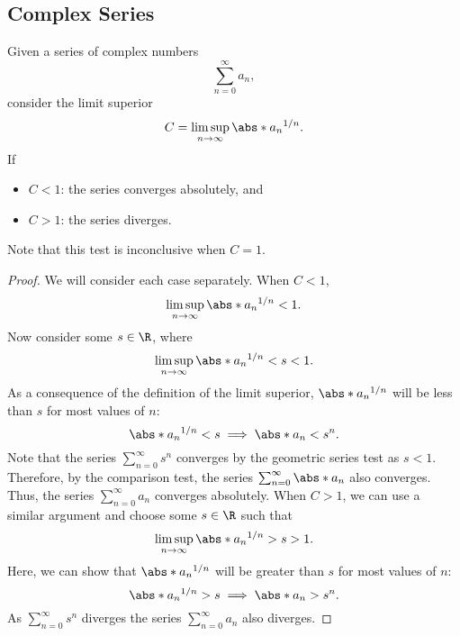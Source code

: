 \documentclass{article}
\begin{document}
\subsection{Complex Series}
\begin{theorem}
    Given a series of complex numbers
    \begin{equation*}
        \sum_{n = 0}^\infty a_n,
    \end{equation*}
    consider the limit superior
    \begin{equation*}
        C = \limsup_{n \to \infty} \abs*{a_n}^{1/n}.
    \end{equation*}
    If
    \begin{itemize}
        \item \(C < 1\): the series converges absolutely, and
        \item \(C > 1\): the series diverges.
    \end{itemize}
    Note that this test is inconclusive when \(C = 1\).
\end{theorem}
\begin{proof}
    We will consider each case separately.
    When \(C < 1\),
    \begin{equation*}
        \limsup_{n \to \infty} \abs*{a_n}^{1/n} < 1.
    \end{equation*}
    Now consider some \(s \in \R\), where
    \begin{equation*}
        \limsup_{n \to \infty} \abs*{a_n}^{1/n} < s < 1.
    \end{equation*}
    As a consequence of the definition of the limit superior,
    \(\abs*{a_n}^{1/n}\) will be less than \(s\) for most values of
    \(n\):
    \begin{equation*}
        \abs*{a_n}^{1/n} < s \implies \abs*{a_n} < s^n.
    \end{equation*}
    Note that the series \(\sum_{n = 0}^\infty s^n\)
    converges by the geometric series test as \(s < 1\). Therefore, by
    the comparison test, the series \(\sum_{n = 0}^\infty \abs*{a_n}\)
    also converges. Thus, the series \(\sum_{n = 0}^\infty a_n\)
    converges absolutely. When \(C > 1\), we can use a similar argument
    and choose some \(s \in \R\) such that
    \begin{equation*}
        \limsup_{n \to \infty} \abs*{a_n}^{1/n} > s > 1.
    \end{equation*}
    Here, we can show that \(\abs*{a_n}^{1/n}\) will be greater than
    \(s\) for most values of \(n\):
    \begin{equation*}
        \abs*{a_n}^{1/n} > s \implies \abs*{a_n} > s^n.
    \end{equation*}
    As \(\sum_{n = 0}^\infty s^n\) diverges the series
    \(\sum_{n = 0}^\infty a_n\) also diverges.
\end{proof}
\end{document}
